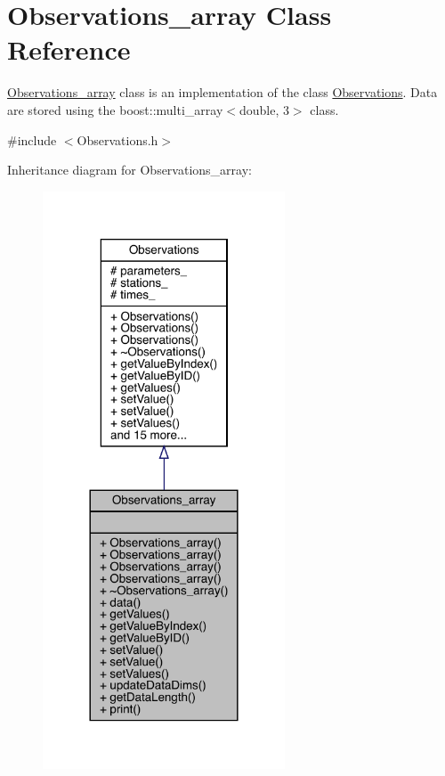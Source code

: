 \hypertarget{class_observations__array}{}\section{Observations\+\_\+array Class Reference}
\label{class_observations__array}


\mbox{\hyperlink{class_observations__array}{Observations\+\_\+array}} class is an implementation of the class \mbox{\hyperlink{class_observations}{Observations}}. Data are stored using the boost\+::multi\+\_\+array$<$double, 3$>$ class.  




{\ttfamily \#include $<$Observations.\+h$>$}



Inheritance diagram for Observations\+\_\+array\+:\nopagebreak
\begin{figure}[H]
\begin{center}
\leavevmode
\includegraphics[width=204pt]{class_observations__array__inherit__graph}
\end{center}
\end{figure}


